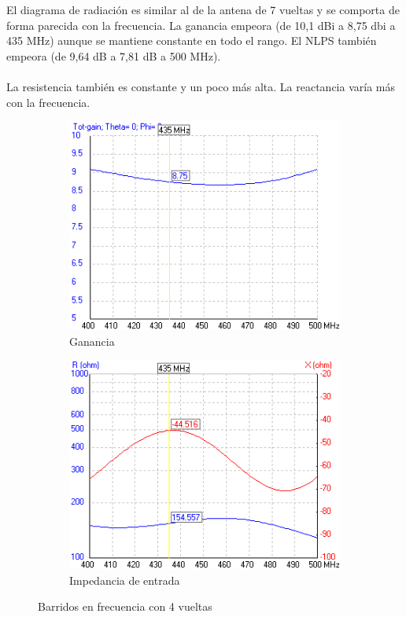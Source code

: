 \documentclass[12pt]{article}
\begin{document}
El diagrama de radiación es similar al de la antena de 7 vueltas y se comporta de forma parecida con la frecuencia. La ganancia empeora (de 10,1 dBi a 8,75 dbi a 435 MHz) aunque se mantiene constante en todo el rango. El NLPS también empeora (de 9,64 dB a 7,81 dB a 500 MHz).\\\\
La resistencia también es constante y un poco más alta. La reactancia varía más con la frecuencia.\\

\begin{figure}[H]
	\centering
	\begin{subfigure}{.45\textwidth}
		\centering
		\includegraphics[width=0.9\linewidth]{helix_4_sweep_gain.png}
		\caption{Ganancia}
	\end{subfigure}%
	\begin{subfigure}{.45\textwidth}
		\centering
		\includegraphics[width=0.9\linewidth]{helix_4_sweep_zin.png}
		\caption{Impedancia de entrada}
	\end{subfigure}
	\caption{Barridos en frecuencia con 4 vueltas}
\end{figure}
\end{document}
